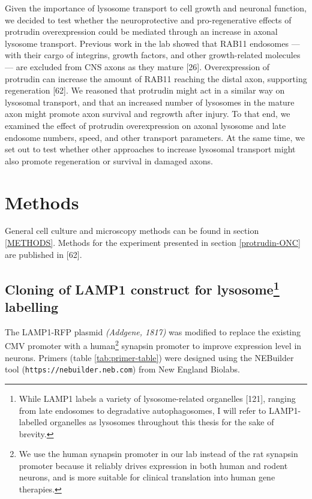 \documentclass[
  12pt,
  a4paper,
]{book}
\begin{document}
Given the importance of lysosome transport to cell growth and neuronal function, we decided to test whether the neuroprotective and pro-regenerative effects of protrudin overexpression could be mediated through an increase in axonal lysosome transport. Previous work in the lab showed that RAB11 endosomes --- with their cargo of integrins, growth factors, and other growth-related molecules --- are excluded from CNS axons as they mature {[}26{]}. Overexpression of protrudin can increase the amount of RAB11 reaching the distal axon, supporting regeneration {[}62{]}. We reasoned that protrudin might act in a similar way on lysosomal transport, and that an increased number of lysosomes in the mature axon might promote axon survival and regrowth after injury. To that end, we examined the effect of protrudin overexpression on axonal lysosome and late endosome numbers, speed, and other transport parameters. At the same time, we set out to test whether other approaches to increase lysosomal transport might also promote regeneration or survival in damaged axons.

\hypertarget{methods}{%
\section{Methods}\label{methods}}

General cell culture and microscopy methods can be found in section \ref{METHODS}. Methods for the experiment presented in section \ref{protrudin-ONC} are published in {[}62{]}.

\hypertarget{cloning}{%
\subsection[Cloning of LAMP1 construct for lysosome labelling]{\texorpdfstring{Cloning of LAMP1 construct for lysosome\footnote{While LAMP1 labels a variety of lysosome-related organelles {[}121{]}, ranging from late endosomes to degradative autophagosomes, I will refer to LAMP1-labelled organelles as lysosomes throughout this thesis for the sake of brevity.} labelling}{Cloning of LAMP1 construct for lysosome labelling}}\label{cloning}}

The LAMP1-RFP plasmid \emph{(Addgene, 1817)} was modified to replace the existing CMV promoter with a human\footnote{We use the human synapsin promoter in our lab instead of the rat synapsin promoter because it reliably drives expression in both human and rodent neurons, and is more suitable for clinical translation into human gene therapies.} synapsin promoter to improve expression level in neurons. Primers (table \ref{tab:primer-table}) were designed using the NEBuilder tool (\texttt{https://nebuilder.neb.com}) from New England Biolabs.
\end{document}
